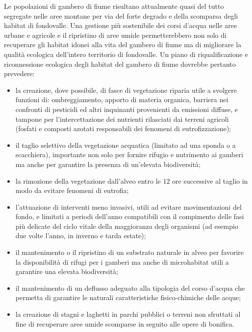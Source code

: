 \documentclass[10pt,twoside,openany,x11names,svgnames,italian,a5paper,dvipsnames,table]{memoir}
\begin{document}
Le popolazioni di gambero di fiume risultano attualmente quasi del tutto segregate nelle aree montane per via del forte degrado e della scomparsa degli habitat di fondovalle. Una gestione più sostenibile dei corsi d’acqua nelle aree urbane e agricole e il ripristino di aree umide permetterebbero non solo di recuperare gli habitat idonei alla vita del gambero di fiume ma di migliorare la qualità ecologica dell’intero territorio di fondovalle. Un piano di riqualificazione e riconnessione ecologica degli habitat del gambero di fiume dovrebbe pertanto prevedere:

\begin{itemize}\itemsep0pt
  \item la creazione, dove possibile, di fasce di vegetazione riparia utile a svolgere funzioni di: ombreggiamento, apporto di materia organica, barriera nei confronti di pesticidi ed altri inquinanti provenienti da emissioni diffuse, e tampone per l’intercettazione dei nutrienti rilasciati dai terreni agricoli (fosfati e composti azotati responsabili dei fenomeni di eutrofizzazione);
  \item il taglio selettivo della vegetazione acquatica (limitato ad una sponda o a scacchiera), importante non solo per fornire rifugio e nutrimento ai gamberi ma anche per garantire la presenza di un'elevata biodiversità; 
  \item la rimozione della vegetazione dall’alveo entro le 12 ore successive al taglio in modo da evitare fenomeni di eutrofia;
  \item l’attuazione di interventi meno invasivi, utili ad evitare movimentazioni del fondo, e limitati a periodi dell’anno compatibili con il compimento delle fasi più delicate del ciclo vitale della maggioranza degli organismi (ad esempio due volte l’anno, in inverno e tarda estate);
  \item il mantenimento o il ripristino di un substrato naturale in alveo per favorire la disponibilità di rifugi per i gamberi ma anche di microhabitat utili a garantire una elevata biodiversità; 
  \item il mantenimento di un deflusso adeguato alla tipologia del corso d’acqua che permetta di garantire le naturali caratteristiche fisico-chimiche delle acque;
  \item la creazione di stagni e laghetti in parchi pubblici o terreni non sfruttati al fine di recuperare aree umide scomparse in seguito alle opere di bonifica.
\end{itemize}
\end{document}
